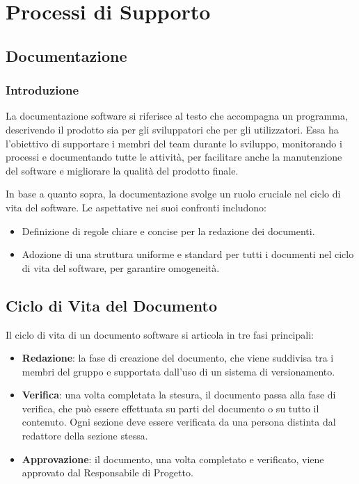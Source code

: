 \section{Processi di Supporto}

\subsection{Documentazione}
\subsubsection{Introduzione}
La documentazione software si riferisce al testo che accompagna un programma, 
descrivendo il prodotto sia per gli sviluppatori che per gli utilizzatori. 
Essa ha l'obiettivo di supportare i membri del team durante lo sviluppo, monitorando i 
processi e documentando tutte le attività, per facilitare anche la manutenzione del software 
e migliorare la qualità del prodotto finale.

In base a quanto sopra, la documentazione svolge un ruolo cruciale nel ciclo di vita del software. 
Le aspettative nei suoi confronti includono:
\begin{itemize}
    \item Definizione di regole chiare e concise per la redazione dei documenti.
    \item Adozione di una struttura uniforme e standard per tutti i documenti nel ciclo di vita del software, per garantire omogeneità.
\end{itemize}

\subsection{Ciclo di Vita del Documento}

Il ciclo di vita di un documento software si articola in tre fasi principali:
\begin{itemize}
    \item \textbf{Redazione}: la fase di creazione del documento, che viene suddivisa tra i membri del gruppo e supportata dall'uso di un sistema di versionamento.
    \item \textbf{Verifica}: una volta completata la stesura, il documento passa alla fase di verifica, 
    che può essere effettuata su parti del documento o su tutto il contenuto. 
    Ogni sezione deve essere verificata da una persona distinta dal redattore della sezione stessa.
    \item \textbf{Approvazione}: il documento, una volta completato e verificato, viene approvato dal Responsabile di Progetto.
\end{itemize}


